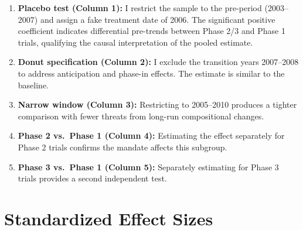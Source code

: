 \documentclass[12pt]{article}
\begin{document}
\begin{enumerate}
\item \textbf{Placebo test (Column 1):} I restrict the sample to the pre-period (2003--2007) and assign a fake treatment date of 2006. The significant positive coefficient indicates differential pre-trends between Phase 2/3 and Phase 1 trials, qualifying the causal interpretation of the pooled estimate.
\item \textbf{Donut specification (Column 2):} I exclude the transition years 2007--2008 to address anticipation and phase-in effects. The estimate is similar to the baseline.
\item \textbf{Narrow window (Column 3):} Restricting to 2005--2010 produces a tighter comparison with fewer threats from long-run compositional changes.
\item \textbf{Phase 2 vs.\ Phase 1 (Column 4):} Estimating the effect separately for Phase 2 trials confirms the mandate affects this subgroup.
\item \textbf{Phase 3 vs.\ Phase 1 (Column 5):} Separately estimating for Phase 3 trials provides a second independent test.
\end{enumerate}

\section{Standardized Effect Sizes}
\label{sec:sde}


\end{document}
